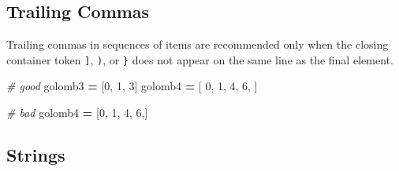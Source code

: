\documentclass[
]{book}
\newenvironment{Shaded}{\begin{snugshade}}{\end{snugshade}}
\newcommand{\CommentTok}[1]{\textcolor[rgb]{0.56,0.35,0.01}{\textit{#1}}}
\newcommand{\DecValTok}[1]{\textcolor[rgb]{0.00,0.00,0.81}{#1}}
\newcommand{\NormalTok}[1]{#1}
\newcommand{\OperatorTok}[1]{\textcolor[rgb]{0.81,0.36,0.00}{\textbf{#1}}}
\begin{document}
\hypertarget{trailing-commas}{%
\subsection{Trailing Commas}\label{trailing-commas}}

Trailing commas in sequences of items are recommended only when the closing
container token \texttt{{]}}, \texttt{)}, or \texttt{\}} does not appear on the same line as the final
element.

\begin{Shaded}
\begin{Highlighting}[]
  \CommentTok{# good}
\NormalTok{  golomb3 }\OperatorTok{=}\NormalTok{ [}\DecValTok{0}\NormalTok{, }\DecValTok{1}\NormalTok{, }\DecValTok{3}\NormalTok{]}
\NormalTok{  golomb4 }\OperatorTok{=}\NormalTok{ [}
      \DecValTok{0}\NormalTok{,}
      \DecValTok{1}\NormalTok{,}
      \DecValTok{4}\NormalTok{,}
      \DecValTok{6}\NormalTok{,}
\NormalTok{  ]}
  
  \CommentTok{# bad}
\NormalTok{  golomb4 }\OperatorTok{=}\NormalTok{ [}\DecValTok{0}\NormalTok{, }\DecValTok{1}\NormalTok{, }\DecValTok{4}\NormalTok{, }\DecValTok{6}\NormalTok{,]}
\end{Highlighting}
\end{Shaded}

\hypertarget{strings}{%
\subsection{Strings}\label{strings}}
\end{document}
